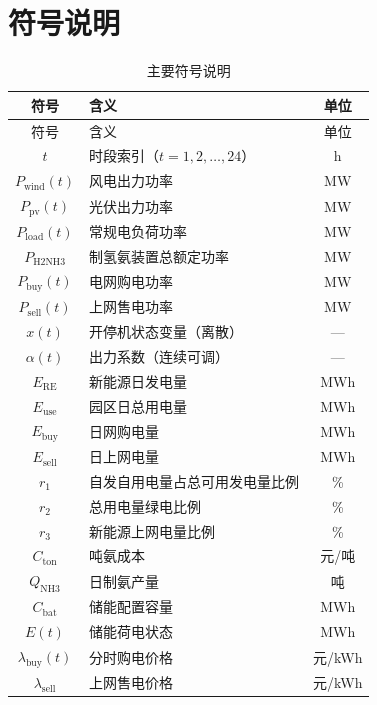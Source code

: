 \section{符号说明}

\begin{longtable}{clc}
\caption{主要符号说明}\label{tab:symbols} \\
\toprule
符号 & 含义 & 单位 \\
\midrule
\endfirsthead
\toprule
符号 & 含义 & 单位 \\
\midrule
\endhead
$t$ & 时段索引（$t=1,2,\ldots,24$） & h \\
$P_{\text{wind}}(t)$ & 风电出力功率 & MW \\
$P_{\text{pv}}(t)$ & 光伏出力功率 & MW \\
$P_{\text{load}}(t)$ & 常规电负荷功率 & MW \\
$P_{\text{H2NH3}}$ & 制氢氨装置总额定功率 & MW \\
$P_{\text{buy}}(t)$ & 电网购电功率 & MW \\
$P_{\text{sell}}(t)$ & 上网售电功率 & MW \\
$x(t)$ & 开停机状态变量（离散） & --- \\
$\alpha(t)$ & 出力系数（连续可调） & --- \\
$E_{\text{RE}}$ & 新能源日发电量 & MWh \\
$E_{\text{use}}$ & 园区日总用电量 & MWh \\
$E_{\text{buy}}$ & 日网购电量 & MWh \\
$E_{\text{sell}}$ & 日上网电量 & MWh \\
$r_1$ & 自发自用电量占总可用发电量比例 & \% \\
$r_2$ & 总用电量绿电比例 & \% \\
$r_3$ & 新能源上网电量比例 & \% \\
$C_{\text{ton}}$ & 吨氨成本 & 元/吨 \\
$Q_{\text{NH3}}$ & 日制氨产量 & 吨 \\
$C_{\text{bat}}$ & 储能配置容量 & MWh \\
$E(t)$ & 储能荷电状态 & MWh \\
$\lambda_{\text{buy}}(t)$ & 分时购电价格 & 元/kWh \\
$\lambda_{\text{sell}}$ & 上网售电价格 & 元/kWh \\
\bottomrule
\end{longtable}
